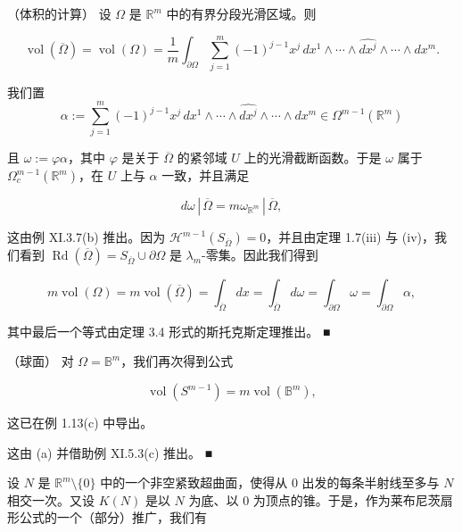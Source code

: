 \begin{example}

\begin{items}
\item

（体积的计算） 设 $ \Omega $ 是 $ \mathbb{R}^m $ 中的有界分段光滑区域。则

\[
\operatorname{vol}(\overline{\Omega}) = \operatorname{vol}(\Omega) = \frac{1}{m}\int_{\partial\Omega}\sum_{j=1}^{m}(-1)^{j-1}x^{j}\,dx^{1}\wedge\cdots\wedge\widehat{dx^{j}}\wedge\cdots\wedge dx^{m}.
\]

\proofhead
我们置
\[
\alpha := \sum_{j=1}^{m}(-1)^{j-1}x^{j}\,dx^{1}\wedge\cdots\wedge\widehat{dx^{j}}\wedge\cdots\wedge dx^{m}\in\Omega^{m-1}(\mathbb{R}^{m})
\]

且 $ \omega := \varphi\alpha $，其中 $ \varphi $ 是关于 $ \overline{\Omega} $ 的紧邻域 $ U $ 上的光滑截断函数。于是 $ \omega $ 属于 $ \Omega_c^{m-1}(\mathbb{R}^m) $，在 $ U $ 上与 $ \alpha $ 一致，并且满足

\[
d\omega\,|\,\overline{\Omega} = m\omega_{\mathbb{R}^m}\,|\,\overline{\Omega},
\]

这由例 XI.3.7(b) 推出。因为 $ \mathcal{H}^{m-1}(S_{\overline{\Omega}}) = 0 $，并且由定理 1.7(iii) 与 (iv)，我们看到 $ \operatorname{Rd}(\overline{\Omega}) = S_{\overline{\Omega}}\cup\partial\Omega $ 是 $ \lambda_m $-零集。因此我们得到

\[
m\operatorname{vol}(\Omega) = m\operatorname{vol}(\overline{\Omega}) = \int_{\overline{\Omega}}dx = \int_{\overline{\Omega}}d\omega = \int_{\partial\Omega}\omega = \int_{\partial\Omega}\alpha,
\]

其中最后一个等式由定理 3.4 形式的斯托克斯定理推出。 \nobreak\hspace{0.35em}■

\item

（球面） 对 $ \Omega = \mathbb{B}^m $，我们再次得到公式

\[
\operatorname{vol}(S^{m-1}) = m\operatorname{vol}(\mathbb{B}^{m}),
\]

这已在例 1.13(c) 中导出。

\proofhead
这由 (a) 并借助例 XI.5.3(c) 推出。 \nobreak\hspace{0.35em}■
\item

设 $ N $ 是 $ \mathbb{R}^m\setminus\{0\} $ 中的一个非空紧致超曲面，使得从 $ 0 $ 出发的每条半射线至多与 $ N $ 相交一次。又设 $ K(N) $ 是以 $ N $ 为底、以 $ 0 $ 为顶点的锥。于是，作为莱布尼茨扇形公式的一个（部分）推广，我们有


\end{items}
\end{example}
